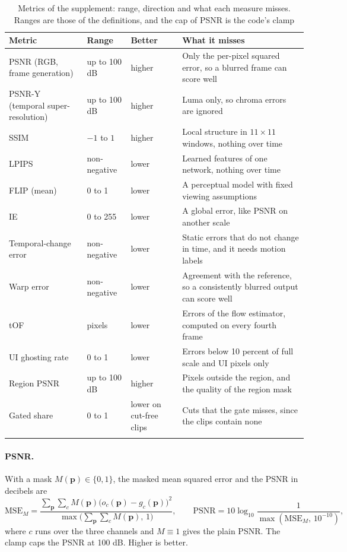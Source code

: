 \begin{table}[!htbp]
\caption{Metrics of the supplement: range, direction and what each measure misses. Ranges are those of the definitions, and the cap of PSNR is the code's clamp}\label{tab:bg-metrics}
\begin{tabular*}{\columnwidth}{@{\extracolsep\fill}p{}p{}p{}p{}}
\toprule
Metric & Range & Better & What it misses \\
\midrule
PSNR (RGB, frame generation) & up to 100 dB & higher & Only the per-pixel squared error, so a blurred frame can score well \\
PSNR-Y (temporal super-resolution) & up to 100 dB & higher & Luma only, so chroma errors are ignored \\
SSIM & $-1$ to $1$ & higher & Local structure in $11\times11$ windows, nothing over time \\
LPIPS & non-negative & lower & Learned features of one network, nothing over time \\
FLIP (mean) & 0 to 1 & lower & A perceptual model with fixed viewing assumptions \\
IE & 0 to 255 & lower & A global error, like PSNR on another scale \\
Temporal-change error & non-negative & lower & Static errors that do not change in time, and it needs motion labels \\
Warp error & non-negative & lower & Agreement with the reference, so a consistently blurred output can score well \\
tOF & pixels & lower & Errors of the flow estimator, computed on every fourth frame \\
UI ghosting rate & 0 to 1 & lower & Errors below 10 percent of full scale and UI pixels only \\
Region PSNR & up to 100 dB & higher & Pixels outside the region, and the quality of the region mask \\
Gated share & 0 to 1 & lower on cut-free clips & Cuts that the gate misses, since the clips contain none \\
\botrule
\end{tabular*}
\end{table}

\paragraph{PSNR.} With a mask $M(\mathbf p)\in\{0,1\}$, the masked mean squared error and the PSNR in decibels are
\begin{equation}
\mathrm{MSE}_M=\frac{\sum_{\mathbf p}\sum_{c}M(\mathbf p)\big(o_c(\mathbf p)-g_c(\mathbf p)\big)^2}{\max\!\big(\sum_{\mathbf p}\sum_{c}M(\mathbf p),\,1\big)},\qquad \mathrm{PSNR}=10\log_{10}\frac{1}{\max(\mathrm{MSE}_M,\,10^{-10})},\label{eq:bg-psnr}
\end{equation}
where $c$ runs over the three channels and $M\equiv1$ gives the plain PSNR. The clamp caps the PSNR at 100 dB. Higher is better.


